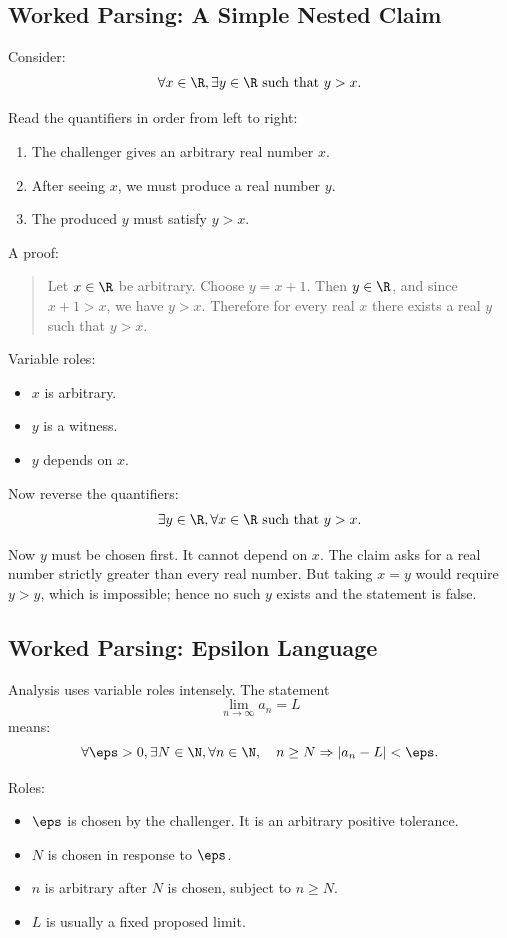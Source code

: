 \subsection{Worked Parsing: A Simple Nested Claim}

Consider:
\[
\forall x\in\R,\exists y\in\R\text{ such that }y>x.
\]

Read the quantifiers in order from left to right:

\begin{enumerate}
\item The challenger gives an arbitrary real number $x$.
\item After seeing $x$, we must produce a real number $y$.
\item The produced $y$ must satisfy $y>x$.
\end{enumerate}

A proof:

\begin{quote}
Let $x\in\R$ be arbitrary. Choose $y=x+1$. Then $y\in\R$, and since $x+1>x$, we have $y>x$. Therefore for every real $x$ there exists a real $y$ such that $y>x$.
\end{quote}

Variable roles:

\begin{itemize}
\item $x$ is arbitrary.
\item $y$ is a witness.
\item $y$ depends on $x$.
\end{itemize}

Now reverse the quantifiers:
\[
\exists y\in\R,\forall x\in\R\text{ such that }y>x.
\]

Now $y$ must be chosen first. It cannot depend on $x$. The claim asks for a real number strictly greater than every real number. But taking $x=y$ would require $y>y$, which is impossible; hence no such $y$ exists and the statement is false.

\subsection{Worked Parsing: Epsilon Language}

Analysis uses variable roles intensely. The statement
\[
\lim_{n\to\infty}a_n=L
\]
means:
\[
\forall \eps>0,\exists N\in\N,\forall n\in\N,\quad n\geq N\Rightarrow |a_n-L|<\eps.
\]

Roles:

\begin{itemize}
\item $\eps$ is chosen by the challenger. It is an arbitrary positive tolerance.
\item $N$ is chosen in response to $\eps$.
\item $n$ is arbitrary after $N$ is chosen, subject to $n\geq N$.
\item $L$ is usually a fixed proposed limit.
\end{itemize}

